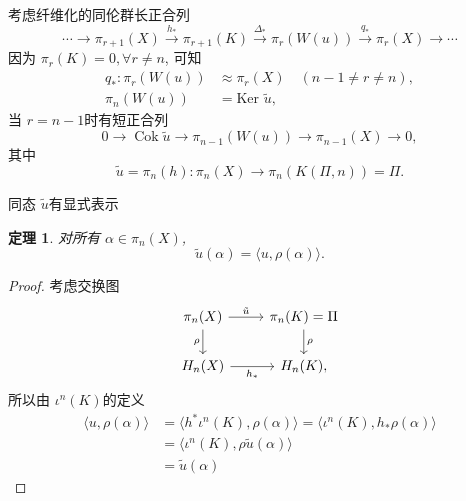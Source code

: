 \documentclass{ctexart}
\theoremstyle{plain}
\newtheorem{theorem}{定理}[section]
\theoremstyle{definition}
\begin{document}
        考虑纤维化的同伦群长正合列 
        \begin{equation}
          \cdots\to \pi_{r+1}(X)\xrightarrow{h_*} \pi_{r+1}(K)\xrightarrow{\Delta_*}\pi_{r}(W(u))\xrightarrow{q_*}\pi_{r}(X)\to \cdots
        \end{equation}
        因为 $\pi_{r}(K)=0,\forall r\neq n$, 可知
        \begin{equation*}
            \begin{aligned}
                q_{*}:\pi_{r}(W(u))&\approx\pi_{r}(X)\quad(n-1\neq r\neq n),\\
                \pi_{n}(W(u))&=\text{Ker }\tilde{u},
            \end{aligned}
        \end{equation*}
        当 $r=n-1$时有短正合列 
        \begin{equation*}
          0\to \operatorname{Cok}\tilde{u}\to \pi_{n-1}(W(u))\to \pi_{n-1}(X)\to 0,
        \end{equation*}
        其中
        \begin{equation*}
          \tilde{u}=\pi_{n}(h):\pi_{n}(X)\to \pi_{n}(K(\Pi,n))=\Pi.
        \end{equation*} 

        同态 $\tilde{u}$有显式表示
        \begin{theorem}
            对所有 $\alpha \in \pi_{n}(X)$,
            \begin{equation*}
                \tilde{u}(\alpha)=\langle u,\rho(\alpha)\rangle.
            \end{equation*}
        \end{theorem}

        \begin{proof}
            考虑交换图 
            \begin{equation*}
              \begin{tikzcd}
                \pi_{n}(X) \arrow[d, "\rho"'] \arrow[r, "\tilde{u}"] & \pi_{n}(K)=\Pi \arrow[d, "\rho"] \\
                H_{n}(X) \arrow[r, "h_*"'] & H_{n}(K),
              \end{tikzcd}
            \end{equation*}
            所以由 $\iota^{n}(K)$的定义
            \begin{equation*}
                \begin{aligned}
                    \langle u,\rho(\alpha)\rangle & =\langle h^{*}\iota^{n}(K), \rho(\alpha)\rangle=\langle\iota^{n}(K), h_{*}\rho(\alpha)\rangle  \\
                    &=\langle\iota^{n}(K), \rho\tilde{u}(\alpha)\rangle \\
                    &=\tilde{u}(\alpha)
                \end{aligned}
            \end{equation*}
        \end{proof}
\end{document}

